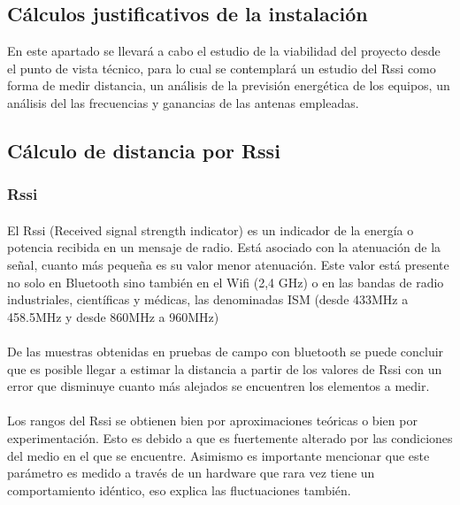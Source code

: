 \documentclass[paper=a4, fontsize=11pt,twoside]{scrartcl}	%
\begin{document}
    \subsection{Cálculos justificativos de la instalación}
        En este apartado se llevará a cabo el estudio de la viabilidad del proyecto desde el punto de vista
        técnico, para lo cual se contemplará un estudio del Rssi como forma de medir distancia, un análisis 
        de la previsión energética de los equipos, un análisis del las frecuencias y ganancias de las antenas 
        empleadas.
    \subsection{Cálculo de distancia por Rssi}
        \subsubsection{Rssi}
            \paragraph{}
            El Rssi (Received signal strength indicator) es un indicador de la energía o potencia recibida en un mensaje de radio. 
            Está asociado con la atenuación de la señal, cuanto más pequeña es su valor menor atenuación. Este valor está 
            presente no solo en Bluetooth sino también en el Wifi (2,4 GHz) o en las bandas de radio industriales, científicas y médicas,
            las denominadas ISM (desde 433MHz a 458.5MHz y desde 860MHz a 960MHz)
            \paragraph{}
            De las muestras obtenidas en pruebas de campo con bluetooth se puede concluir que es posible llegar a estimar la distancia
            a partir de los valores de Rssi con un error que disminuye cuanto más alejados se encuentren los elementos a medir. 
            \paragraph{}
            Los rangos del Rssi se obtienen bien por aproximaciones teóricas o bien por experimentación. Esto es debido a que 
            es fuertemente alterado por las condiciones del medio en el que se encuentre. Asimismo es importante mencionar que
            este parámetro es medido a través de un hardware que rara vez tiene un comportamiento idéntico, eso explica las fluctuaciones 
            también.
\end{document}

